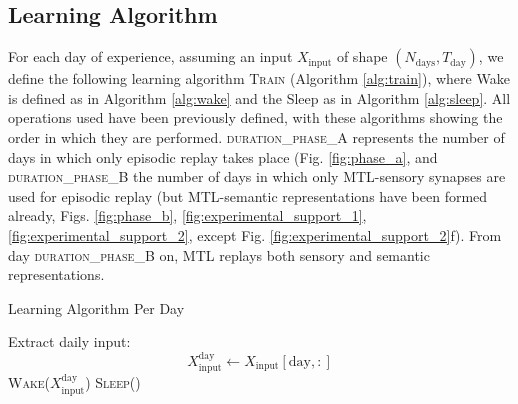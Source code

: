 \documentclass{article}
\begin{document}
\subsection*{Learning Algorithm}
For each day of experience, assuming an input $X_\textrm{input}$ of shape $(N_\textrm{days}, T_\textrm{day})$, we define the following learning algorithm \textsc{Train} (Algorithm \ref{alg:train}), where \textrm{Wake} is defined as in Algorithm \ref{alg:wake} and the \textrm{Sleep} as in Algorithm \ref{alg:sleep}. All operations used have been previously defined, with these algorithms showing the order in which they are performed. \textsc{duration\_phase\_A} represents the number of days in which only episodic replay takes place (Fig. \ref{fig:phase_a}, and  \textsc{duration\_phase\_B} the number of days in which only MTL-sensory synapses are used for episodic replay (but MTL-semantic representations have been formed already, Figs. \ref{fig:phase_b}, \ref{fig:experimental_support_1}, \ref{fig:experimental_support_2}, except Fig. \ref{fig:experimental_support_2}f). From day \textsc{duration\_phase\_B} on, MTL replays both sensory and semantic representations. 
\begin{algorithm}[h!]
\caption{Learning Algorithm Per Day}\label{alg:train}
\begin{algorithmic}[1]
        \State Extract daily input:
            \[
            X^{\textrm{day}}_\textrm{input} \gets X_\textrm{input}[\textrm{day},:]
            \]
        \State \textsc{Wake}($X^{\textrm{day}}_\textrm{input}$)
        \State \textsc{Sleep}()
    \EndFor
\EndFunction
\end{algorithmic}
\end{algorithm}
\end{document}
